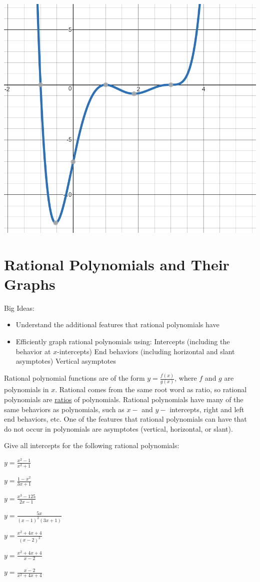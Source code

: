 \begin{center} \includegraphics[scale=.3]{p4.png} \end{center}
\eq

\section{Rational Polynomials and Their Graphs}
Big Ideas:
\begin{itemize}
\item Understand the additional features that rational polynomials have
\item Efficiently graph rational polynomials using:
\subitem Intercepts (including the behavior at $x$-intercepts)
\subitem End behaviors (including horizontal and slant asymptotes)
\subitem Vertical asymptotes
\end{itemize}
\begin{info} Rational polynomial functions are of the form $y =\frac{f(x)}{g(x)}$, where $f$ and $g$ are polynomials in $x$. Rational comes from the same root word as ratio, so rational polynomials are \underline{ratios} of polynomials. Rational polynomials have many of the same behaviors as polynomials, such as $x-$ and $y-$ intercepts, right and left end behaviors, etc. One of the features that rational polynomials can have that do not occur in polynomials are asymptotes (vertical, horizontal, or slant).\end{info}
\bq Give all intercepts for the following rational polynomials:
\be
\item $y=\frac{x^2-1}{x^2+1}$
\item $y=\frac{1-x^2}{3x+1}$
\item $y=\frac{x^3-125}{2x-1}$
\item $y=\frac{5x}{(x-1)^2(3x+1)}$
\item $y=\frac{x^2+4x+4}{(x-2)^2}$
\item $y=\frac{x^2+4x+4}{x-2}$
\item $y=\frac{x-2}{x^2+4x+4}$
\ee
\eq

